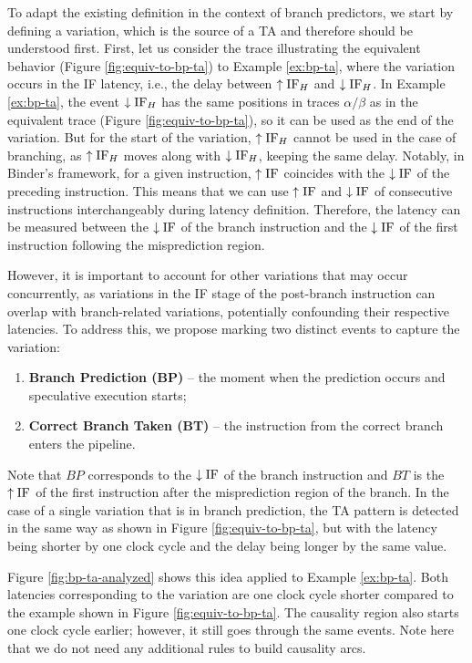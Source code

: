 To adapt the existing definition in the context of branch predictors, we start by defining a variation, which is the source of a TA and therefore should be understood first. First, let us consider the trace illustrating the equivalent behavior (Figure \ref{fig:equiv-to-bp-ta}) to Example \ref{ex:bp-ta}, where the variation occurs in the IF latency, i.e., the delay between $\uparrow\mathrm{IF}_H$ and $\downarrow\mathrm{IF}_H$. In Example \ref{ex:bp-ta}, the event $\downarrow\mathrm{IF}_H$ has the same positions in traces $\alpha/\beta$ as in the equivalent trace (Figure \ref{fig:equiv-to-bp-ta}), so it can be used as the end of the variation. But for the start of the variation, $\uparrow\mathrm{IF}_H$ cannot be used in the case of branching, as $\uparrow\mathrm{IF}_H$ moves along with $\downarrow\mathrm{IF}_H$, keeping the same delay. Notably, in Binder's framework, for a given instruction, $\uparrow\mathrm{IF}$ coincides with the $\downarrow\mathrm{IF}$ of the preceding instruction. This means that we can use $\uparrow\mathrm{IF}$ and $\downarrow\mathrm{IF}$ of consecutive instructions interchangeably during latency definition. Therefore, the latency can be measured between the $\downarrow\mathrm{IF}$ of the branch instruction and the $\downarrow\mathrm{IF}$ of the first instruction following the misprediction region.

However, it is important to account for other variations that may occur concurrently, as variations in the IF stage of the post-branch instruction can overlap with branch-related variations, potentially confounding their respective latencies. To address this, we propose marking two distinct events to capture the variation:


\begin{enumerate}
    \item \textbf{Branch Prediction (BP)} -- the moment when the prediction occurs and speculative execution starts;
    \item \textbf{Correct Branch Taken (BT)} -- the instruction from the correct branch enters the pipeline.
\end{enumerate}

Note that $BP$ corresponds to the $\downarrow\mathrm{IF}$ of the branch instruction and $BT$ is the $\uparrow\mathrm{IF}$ of the first instruction after the misprediction region of the branch. In the case of a single variation that is in branch prediction, the TA pattern is detected in the same way as shown in Figure \ref{fig:equiv-to-bp-ta}, but with the latency being shorter by one clock cycle and the delay being longer by the same value.

Figure \ref{fig:bp-ta-analyzed} shows this idea applied to Example \ref{ex:bp-ta}. Both latencies corresponding to the variation are one clock cycle shorter compared to the example shown in Figure \ref{fig:equiv-to-bp-ta}. The causality region also starts one clock cycle earlier; however, it still goes through the same events. Note here that we do not need any additional rules to build causality arcs.

